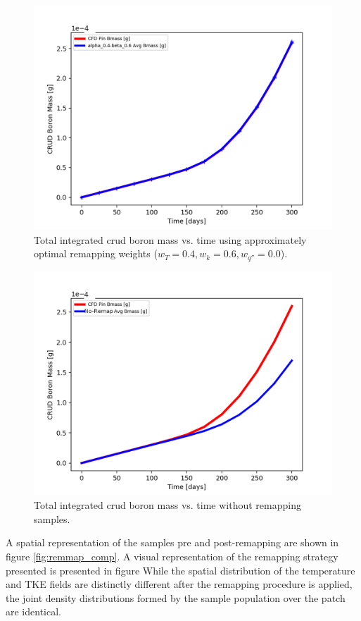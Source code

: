 \begin{figure}[H]
    \centering
    \includegraphics[width=0.7\linewidth]{figs/synth/cmpr_pin_totals_0_4_0_6}
    \caption[Total integrated crud boron mass vs. time using approximately optimal remapping weights.]{Total integrated crud boron mass vs. time using approximately optimal remapping weights ($w_T=0.4, w_{k}=0.6, w_{q''}=0.0$).}
    \label{fig:cmprpintotals0406}
\end{figure}
\begin{figure}[H]
    \centering
    \includegraphics[width=0.7\linewidth]{figs/synth/cmpr_pin_totals_no_remap}
    \caption{Total integrated crud boron mass vs. time without remapping samples.}
    \label{fig:cmprpintotalsnoremap}
\end{figure}

A spatial representation of the samples pre and post-remapping are shown in figure \ref{fig:remmap_comp}.  A visual representation of the remapping strategy presented is presented in figure %
While the spatial distribution of the temperature and TKE fields are distinctly different after the remapping procedure is applied, the joint density distributions formed by the sample population over the patch are identical.

